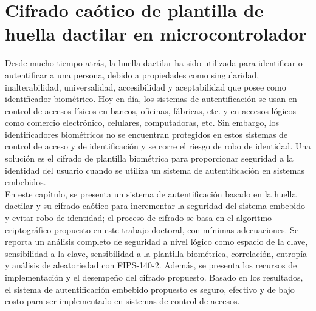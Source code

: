 
\chapter{Cifrado caótico de plantilla de huella dactilar en microcontrolador}
Desde mucho tiempo atrás, la huella dactilar ha sido utilizada para identificar o autentificar a una persona, debido a propiedades como singularidad, inalterabilidad, universalidad, accesibilidad y aceptabilidad que posee como identificador biométrico. Hoy en día, los sistemas de autentificación se usan en control de accesos físicos en bancos, oficinas, fábricas, etc. y en accesos lógicos como comercio electrónico, celulares, computadoras, etc. Sin embargo, los identificadores biométricos no se encuentran protegidos en estos sistemas de control de acceso y de identificación y se corre el riesgo de robo de identidad. Una solución es el cifrado de plantilla biométrica para proporcionar seguridad a la identidad del usuario cuando se utiliza un sistema de autentificación en sistemas embebidos. \\

En este capítulo, se presenta un sistema de autentificación basado en la huella dactilar y su cifrado caótico para incrementar la seguridad del sistema embebido y evitar robo de identidad; el proceso de cifrado se basa en el algoritmo criptográfico propuesto en este trabajo doctoral, con mínimas adecuaciones. Se reporta un análisis completo de seguridad a nivel lógico como espacio de la clave, sensibilidad a la clave, sensibilidad a la plantilla biométrica, correlación, entropía y análisis de aleatoriedad con FIPS-140-2. Además, se presenta los recursos de implementación y el desempeño del cifrado propuesto. Basado en los resultados, el sistema de autentificación embebido propuesto es seguro, efectivo y de bajo costo para ser implementado en sistemas de control de accesos.


